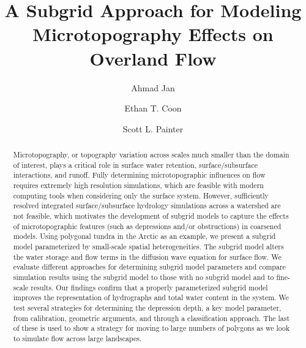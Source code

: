 \documentclass[review,11pt]{elsarticle}
\begin{document}
\newcommand{\ethan}[1]{{\color{blue}{#1}}}


\begin{frontmatter}

\title{A Subgrid Approach for Modeling  Microtopography  Effects on Overland Flow}
\author[ornl]{Ahmad Jan } \author[ornl]{Ethan T. Coon} \author[ornl]{Scott L. Painter}

\address[ornl]{Climate Change Science Institute and Environmental Sciences Division, Oak Ridge National Laboratory, Oak Ridge, Tennessee, USA} 
 




\begin{abstract}
Microtopography, or topography variation across scales much smaller than the domain of interest, plays a critical role in surface water retention, surface/subsurface interactions, and runoff.
Fully determining microtopographic influences on flow requires extremely high resolution simulations, which are feasible with modern computing tools when considering only the surface system.
However, sufficiently resolved integrated surface/subsurface hydrology simulations across a watershed are not feasible, which motivates the development of subgrid models to capture the effects of microtopographic features (such as depressions and/or obstructions) in coarsened models.
Using polygonal tundra in the Arctic as an example, we present a subgrid model parameterized by small-scale spatial heterogeneities.
The subgrid model alters the water storage and flow terms in the diffusion wave equation for surface flow.
We evaluate different approaches for determining subgrid model parameters and compare simulation results using the subgrid model to those with no subgrid model and to fine-scale results.
Our findings confirm that a properly parameterized subgrid model improves the representation of hydrographs and total water content in the system.
We test several strategies for determining the depression depth, a key model parameter, from calibration, geometric arguments, and through a classification approach.
The last of these is used to show a strategy for moving to large numbers of polygons as we look to simulate flow across large landscapes.
\end{abstract}


\end{frontmatter}
\end{document}
